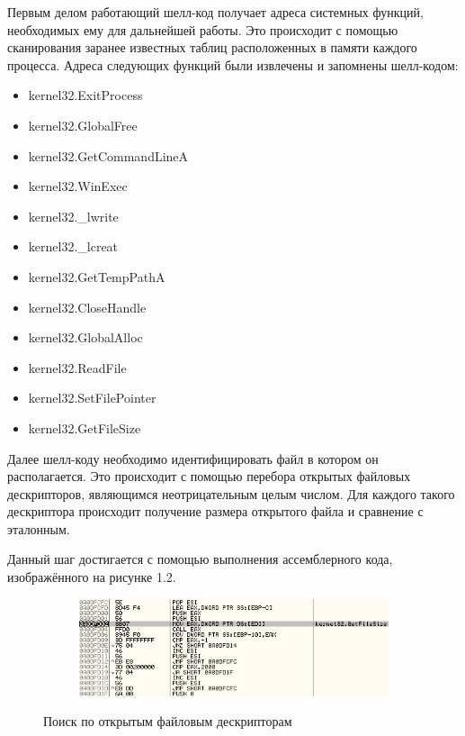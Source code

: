 Первым делом работающий шелл-код получает адреса системных функций, необходимых ему для дальнейшей работы.
Это происходит с помощью сканирования заранее известных таблиц расположенных в памяти каждого процесса. \cite{peb_ldr}\cite{peb_ldr_example}
Адреса следующих функций были извлечены и запомнены шелл-кодом:
\begin{itemize}
\item kernel32.ExitProcess
\item kernel32.GlobalFree
\item kernel32.GetCommandLineA
\item kernel32.WinExec
\item kernel32.\_lwrite
\item kernel32.\_lcreat
\item kernel32.GetTempPathA
\item kernel32.CloseHandle
\item kernel32.GlobalAlloc
\item kernel32.ReadFile
\item kernel32.SetFilePointer
\item kernel32.GetFileSize
\end{itemize}

Далее шелл-коду необходимо идентифицировать файл в котором он располагается.
Это происходит с помощью перебора открытых файловых дескрипторов, являющимся неотрицательным целым числом.
Для каждого такого дескриптора происходит получение размера открытого файла и сравнение с эталонным.

\newpage
Данный шаг достигается с помощью выполнения ассемблерного кода, изображённого на рисунке 1.2. 

\begin{figure}[ht]
	\centering
    \begin{subfigure}[b]{1\textwidth}
    \centering
        \includegraphics[scale=0.8]{1.pdf/pasted-image-19.png}
    \end{subfigure}
 
    \caption{Поиск по открытым файловым дескрипторам}
    \label{fig_parsetree}
\end{figure}

